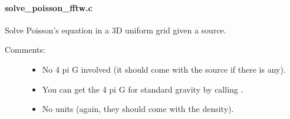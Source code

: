 \documentclass[letterpaper,10pt,english]{sphinxmanual}
\begin{document}
\paragraph{solve\_poisson\_fftw.c}
\label{\detokenize{sphinx-c-apidoc/output/gravity/newton/fft_solver/solve_poisson_fftw_c:solve-poisson-fftw-c}}\label{\detokenize{sphinx-c-apidoc/output/gravity/newton/fft_solver/solve_poisson_fftw_c::doc}}
Solve Poisson’s equation in a 3D uniform grid given a source.
\begin{description}
\item[{Comments:}] \leavevmode\begin{itemize}
\item {} 
No 4 pi G involved (it should come with the source if there is any).

\item {} 
You can get the 4 pi G for standard gravity by calling .

\item {} 
No units (again, they should come with the density).

\end{itemize}

\end{description}

\begin{fulllineitems}
\label{\detokenize{sphinx-c-apidoc/output/gravity/newton/fft_solver/solve_poisson_fftw_c:c.anti_transforms}}%
\pysigstartmultiline
{}%
\pysigstopmultiline
\end{fulllineitems}


\begin{fulllineitems}
\label{\detokenize{sphinx-c-apidoc/output/gravity/newton/fft_solver/solve_poisson_fftw_c:c.index}}%
\pysigstartmultiline
{}%
\pysigstopmultiline
\end{fulllineitems}
\end{document}
